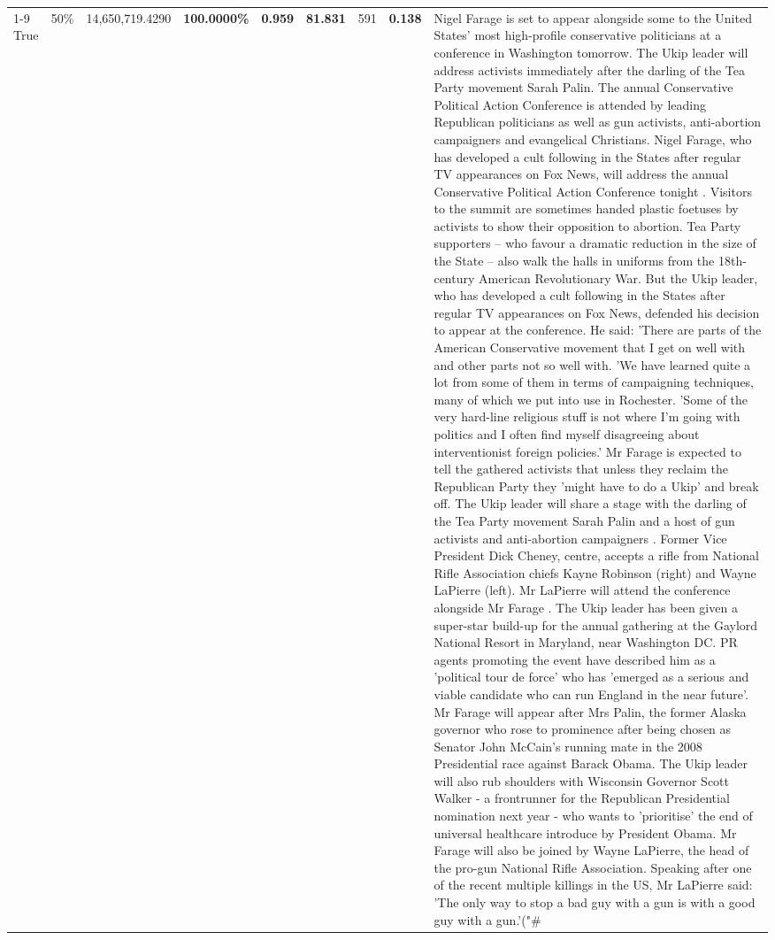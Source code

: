 \begin{table}[H]
\begin{tabular}{lllrlllll}
\cline{1-9} \cline{2-9}
True & 50\% & 14,650,719.4290 & \bfseries \color{red} 100.0000\% & \bfseries \color{red} 0.959 & \bfseries \color{red} 81.831 & 591 & \bfseries \color{red} 0.138 & Nigel Farage is set to appear alongside some to the United States' most high-profile conservative politicians at a conference in Washington tomorrow. The Ukip leader will address activists immediately after the darling of the Tea Party movement Sarah Palin. The annual Conservative Political Action Conference is attended by leading Republican politicians as well as gun activists, anti-abortion campaigners and evangelical Christians. Nigel Farage, who has developed a cult following in the States after regular TV appearances on Fox News, will address the annual Conservative Political Action Conference tonight . Visitors to the summit are sometimes handed plastic foetuses by activists to show their opposition to abortion. Tea Party supporters – who favour a dramatic reduction in the size of the State – also walk the halls in uniforms from the 18th-century American Revolutionary War. But the Ukip leader, who has developed a cult following in the States after regular TV appearances on Fox News, defended his decision to appear at the conference. He said: 'There are parts of the American Conservative movement that I get on well with and other parts not so well with. 'We have learned quite a lot from some of them in terms of campaigning techniques, many of which we put into use in Rochester. 'Some of the very hard-line religious stuff is not where I'm going with politics and I often find myself disagreeing about interventionist foreign policies.' Mr Farage is expected to tell the gathered activists that unless they reclaim the Republican Party they 'might have to do a Ukip' and break off. The Ukip leader will share a stage with the darling of the Tea Party movement Sarah Palin and a host of gun activists and anti-abortion campaigners . Former Vice President Dick Cheney, centre, accepts a rifle from National Rifle Association chiefs Kayne Robinson (right) and Wayne LaPierre (left). Mr LaPierre will attend the conference alongside Mr Farage . The Ukip leader has been given a super-star build-up for the annual gathering at the Gaylord National Resort in Maryland, near Washington DC. PR agents promoting the event have described him as a 'political tour de force' who has 'emerged as a serious and viable candidate who can run England in the near future'. Mr Farage will appear after Mrs Palin, the former Alaska governor who rose to prominence after being chosen as Senator John McCain's running mate in the 2008 Presidential race against Barack Obama. The Ukip leader will also rub shoulders with Wisconsin Governor Scott Walker - a frontrunner for the Republican Presidential nomination next year - who wants to 'prioritise' the end of universal healthcare introduce by President Obama. Mr Farage will also be joined by Wayne LaPierre, the head of the pro-gun National Rifle Association. Speaking after one of the recent multiple killings in the US, Mr LaPierre said: 'The only way to stop a bad guy with a gun is with a good guy with a gun.'("\# \\

\end{tabular}
\end{table}
